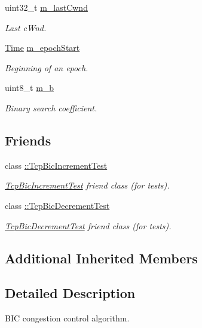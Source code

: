 \begin{DoxyCompactItemize}
uint32\+\_\+t \hyperlink{classns3_1_1TcpBic_a5014112a75f21b8bc1a0e50b79ab4e31}{m\+\_\+last\+Cwnd}
\begin{DoxyCompactList}\small\item\em Last c\+Wnd. \end{DoxyCompactList}\item 
\hyperlink{classns3_1_1Time}{Time} \hyperlink{classns3_1_1TcpBic_ae0f10aaccd31702d06dc3fb76450ac38}{m\+\_\+epoch\+Start}
\begin{DoxyCompactList}\small\item\em Beginning of an epoch. \end{DoxyCompactList}\item 
uint8\+\_\+t \hyperlink{classns3_1_1TcpBic_a3f94d435d1b4821077da9acb72fd8d5f}{m\+\_\+b}
\begin{DoxyCompactList}\small\item\em Binary search coefficient. \end{DoxyCompactList}\end{DoxyCompactItemize}
\subsection*{Friends}
\begin{DoxyCompactItemize}
\item 
class \hyperlink{classns3_1_1TcpBic_a82f141cadbdca4c006cec6e378649e80}{\+::\+Tcp\+Bic\+Increment\+Test}
\begin{DoxyCompactList}\small\item\em \hyperlink{classTcpBicIncrementTest}{Tcp\+Bic\+Increment\+Test} friend class (for tests). \end{DoxyCompactList}\item 
class \hyperlink{classns3_1_1TcpBic_a5350d9423de9d4dc9ea8e8d6212b1f3a}{\+::\+Tcp\+Bic\+Decrement\+Test}
\begin{DoxyCompactList}\small\item\em \hyperlink{classTcpBicDecrementTest}{Tcp\+Bic\+Decrement\+Test} friend class (for tests). \end{DoxyCompactList}\end{DoxyCompactItemize}
\subsection*{Additional Inherited Members}


\subsection{Detailed Description}
B\+IC congestion control algorithm. 

